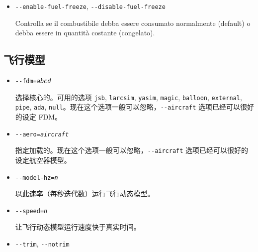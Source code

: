 \begin{itemize}
{\begin{itemize}
  Specifica se partire al livello del suolo (default), o in aria. Se si specifica \texttt{-$ $-in-air}
  necessario impostare anche una quota iniziale utilizzando \texttt{-$ $-altitude}
  , e si consiglia inoltre di impostare una velocit\`{a} iniziale con
  \texttt{-$ $-vc}. Si noti che alcuni aerei (in particolare l'X15) devono essere avviati a mezz'aria.

  \item{\texttt{-$ $-enable-fuel-freeze}, \texttt{-$ $-disable-fuel-freeze}}

  Controlla se il combustibile debba essere consumato normalmente (default) o
  debba essere in quantit\`{a} costante (congelato).

  \end{itemize}
}

\ifchinese
{
  \subsection{飞行模型}\label{flight dynamics model}
  \begin{itemize}
  \item{\texttt{-$ $-fdm={\it abcd}}}

  选择核心的。可用的选项 \texttt{jsb}, \texttt{larcsim}, \texttt{yasim}, \texttt{magic}, \texttt{balloon}, \texttt{external}, \texttt{pipe}, \texttt{ada}, \texttt{null}。现在这个选项一般可以忽略，\texttt{-$ $-aircraft} 选项已经可以很好的设定 FDM。

\item{\texttt{-$ $-aero={\it aircraft}}}

  指定加载的。现在这个选项一般可以忽略，\texttt{-$ $-aircraft} 选项已经可以很好的设定航空器模型。

 \item{\texttt{-$ $-model-hz={\it n}}}
  
  以此速率（每秒迭代数）运行飞行动态模型。

 \item{\texttt{-$ $-speed={\it n}}}

  让飞行动态模型运行速度快于真实时间。

\item{\texttt{-$ $-trim}, \texttt{-$ $-notrim}}


\end{itemize}}
\end{itemize}
